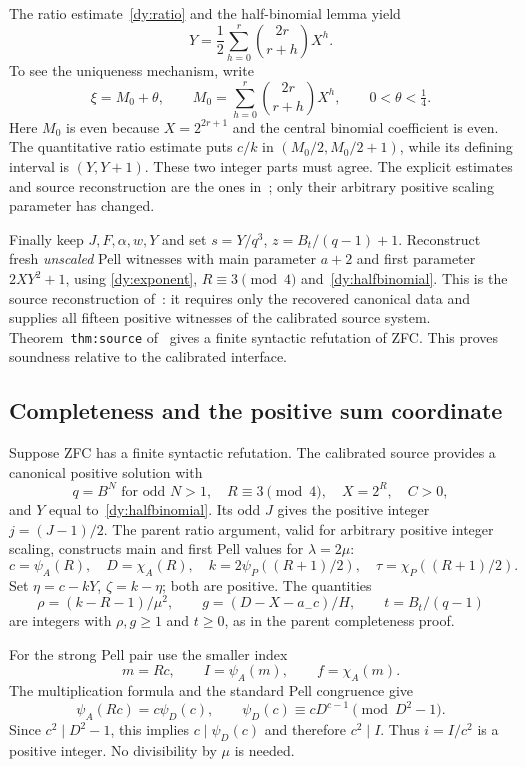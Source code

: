 The ratio estimate~\eqref{dy:ratio} and the half-binomial lemma yield
\begin{equation}
 Y=\frac12\sum_{h=0}^r\binom{2r}{r+h}X^h.
 \label{dy:halfbinomial}
\end{equation}
To see the uniqueness mechanism, write
\[
 \xi=M_0+\theta,\qquad
 M_0=\sum_{h=0}^r\binom{2r}{r+h}X^h,\qquad0<\theta<\tfrac14.
\]
Here $M_0$ is even because $X=2^{2r+1}$ and the central binomial
coefficient is even.  The quantitative ratio estimate puts $c/k$ in
$(M_0/2,M_0/2+1)$, while its defining interval is $(Y,Y+1)$.
These two integer parts must agree.  The explicit estimates and source
reconstruction are the ones in~\cite[Sections 6.17--6.18]{parent816};
only their arbitrary positive scaling parameter has changed.

Finally keep $J,F,\alpha,w,Y$ and set
$s=Y/q^3$, $z=B_t/(q-1)+1$.
Reconstruct fresh \emph{unscaled} Pell witnesses with main parameter
$a+2$ and first parameter $2XY^2+1$, using
\eqref{dy:exponent}, $R\equiv3\pmod4$ and~\eqref{dy:halfbinomial}.
This is the source reconstruction of~\cite[Section 6.18]{parent816}:
it requires only the recovered canonical data and supplies all fifteen
positive witnesses of the calibrated source system.
Theorem~\texttt{thm:source} of~\cite{source61} gives a finite syntactic
refutation of ZFC.  This proves soundness relative to the calibrated
interface.

\subsection{Completeness and the positive sum coordinate}
\label{dy:completeness}

Suppose ZFC has a finite syntactic refutation.  The calibrated source
provides a canonical positive solution with
\[
 q=B^N\text{ for odd }N>1,\quad R\equiv3\pmod4,\quad
 X=2^R,\quad C>0,
\]
and $Y$ equal to~\eqref{dy:halfbinomial}.  Its odd $J$ gives the positive
integer $j=(J-1)/2$.
The parent ratio argument, valid for arbitrary positive integer scaling,
constructs main and first Pell values for $\lambda=2\mu$:
\[
 c=\psi_A(R),\quad D=\chi_A(R),\quad
 k=2\psi_P((R+1)/2),\quad \tau=\chi_P((R+1)/2).
\]
Set $\eta=c-kY$, $\zeta=k-\eta$; both are positive.
The quantities
\[
 \rho=(k-R-1)/\mu^2,\qquad
 g=(D-X-a_-c)/H,\qquad t=B_t/(q-1)
\]
are integers with $\rho,g\ge1$ and $t\ge0$, as in the parent
completeness proof.

For the strong Pell pair use the smaller index
\begin{equation}
 m=Rc,\qquad I=\psi_A(m),\qquad f=\chi_A(m).
 \label{dy:strongcomplete}
\end{equation}
The multiplication formula and the standard Pell congruence give
\[
 \psi_A(Rc)=c\psi_D(c),\qquad
 \psi_D(c)\equiv cD^{c-1}\pmod{D^2-1}.
\]
Since $c^2\mid D^2-1$, this implies $c\mid\psi_D(c)$ and therefore
$c^2\mid I$.  Thus $i=I/c^2$ is a positive integer.
No divisibility by $\mu$ is needed.


